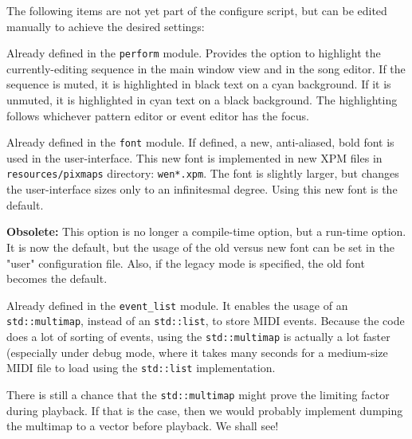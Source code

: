    The following items are not yet part of the configure script, but can
   be edited manually to achieve the desired settings:

   \setcounter{ItemCounter}{0}      %
   
        Already defined in the \texttt{perform} module.
        Provides the option to highlight the currently-editing sequence in the
        main window view and in the song editor.  If the sequence is muted, it
        is highlighted in black text on a cyan background.  If it is unmuted,
        it is highlighted in cyan text on a black background.  The highlighting
        follows whichever pattern editor or event editor has the focus.

        Already defined in the \texttt{font} module.
        If defined, a new, anti-aliased,
        bold font is used in the user-interface.  This new font is implemented
        in new XPM files in \texttt{resources/pixmaps} directory:
        \texttt{wen*.xpm}.  The font is slightly
        larger, but changes the user-interface sizes only to an infinitesmal
        degree.  Using this new font is the default.

        \textbf{Obsolete:}
        This option is no longer a compile-time option, but a run-time option.
        It is now the default, but the usage of the old versus new font can be
        set in the "user" configuration file.
        Also, if the legacy mode is specified, the old font becomes the
        default.

        Already defined in the \texttt{event\_list} module.
        It enables the usage of an
        \texttt{std::multimap}, instead of an \texttt{std::list},
        to store MIDI events.  Because
        the code does a lot of sorting of events, using the
        \texttt{std::multimap} is actually a lot faster (especially under debug
        mode, where it takes
        many seconds for a medium-size MIDI file to load using the
        \texttt{std::list} implementation.

        There is still a chance that the \texttt{std::multimap} might prove the
        limiting factor during playback.  If that is the case, then we would
        probably implement dumping the multimap to a vector before playback.
        We shall see!

